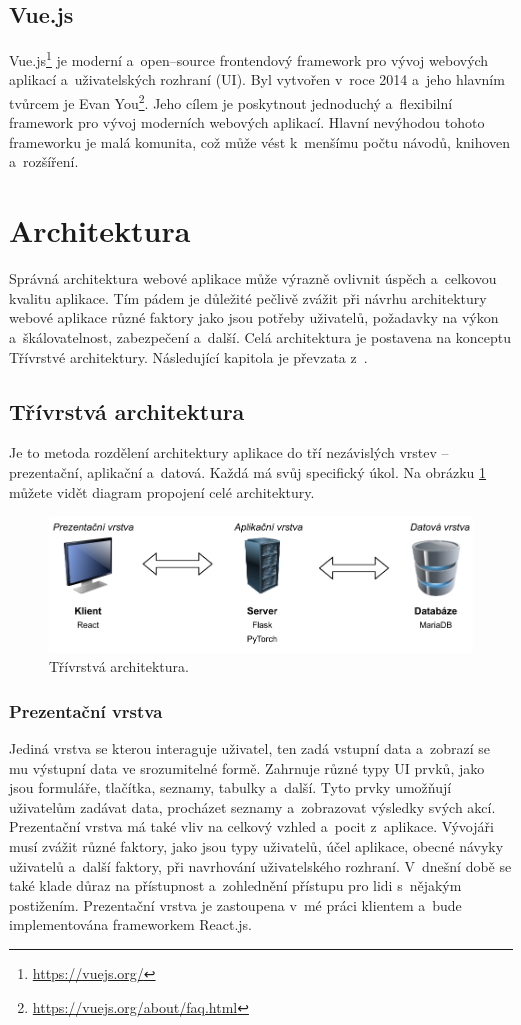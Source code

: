 \subsection{Vue.js}
Vue.js\footnote{\url{https://vuejs.org/}} je moderní a~open--source frontendový framework pro vývoj webových aplikací a~uživatelských rozhraní (UI). Byl vytvořen v~roce 2014 a~jeho hlavním tvůrcem je Evan You\footnote{\url{https://vuejs.org/about/faq.html}}. Jeho cílem je poskytnout jednoduchý a~flexibilní framework pro vývoj moderních webových aplikací. Hlavní nevýhodou tohoto frameworku je malá komunita, což může vést k~menšímu počtu návodů, knihoven a~rozšíření.

\section{Architektura}
Správná architektura webové aplikace může výrazně ovlivnit úspěch a~celkovou kvalitu aplikace. Tím pádem je důležité pečlivě zvážit při návrhu architektury webové aplikace různé faktory jako jsou potřeby uživatelů, požadavky na výkon a~škálovatelnost, zabezpečení a~další. Celá architektura je postavena na konceptu Třívrstvé architektury. Následující kapitola je převzata z~\cite{rouse_2021_threetier}.
\subsection{Třívrstvá architektura}
Je to metoda rozdělení architektury aplikace do tří nezávislých vrstev -- prezentační, aplikační a~datová. Každá má svůj specifický úkol. Na obrázku \ref{fig:trivstva} můžete vidět diagram propojení celé architektury.


\begin{figure}[ht]
\centering
\includegraphics[width=\textwidth]{./obrazky-figures/server_klient.pdf}
\caption{Třívrstvá architektura.}
\label{fig:trivstva}
\end{figure}

\subsubsection{Prezentační vrstva}
Jediná vrstva se kterou interaguje uživatel, ten zadá vstupní data a~zobrazí se mu výstupní data ve srozumitelné formě. Zahrnuje různé typy UI prvků, jako jsou formuláře, tlačítka, seznamy, tabulky a~další. Tyto prvky umožňují uživatelům zadávat data, procházet seznamy a~zobrazovat výsledky svých akcí. Prezentační vrstva má také vliv na celkový vzhled a~pocit z~aplikace. Vývojáři musí zvážit různé faktory, jako jsou typy uživatelů, účel aplikace, obecné návyky uživatelů a~další faktory, při navrhování uživatelského rozhraní. V~dnešní době se také klade důraz na přístupnost a~zohlednění přístupu pro lidi s~nějakým postižením. Prezentační vrstva je zastoupena v~mé práci klientem a~bude implementována frameworkem React.js.

